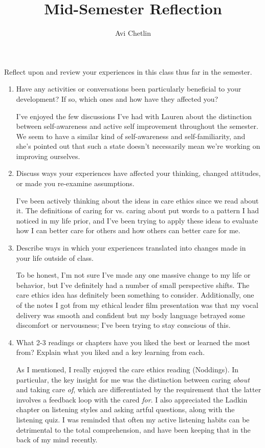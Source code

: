 \documentclass[12pt,stu,biblatex]{apa7}
\author{Avi Chetlin}
\affiliation{Case Western Reserve University}
\title{Mid-Semester Reflection}
\begin{document}
\maketitle
\singlespacing
Reflect upon and review your experiences in this class thus far in the semester.

\begin{enumerate}
  \item Have any activities or conversations been particularly beneficial to your development?
        If so, which ones and how have they affected you?

        I've enjoyed the few discussions I've had with Lauren about the distinction between self-awareness and active self improvement throughout the semester.
        We seem to have a similar kind of self-awareness and self-familiarity, and she's pointed out that such a state doesn't necessarily mean we're working on improving ourselves.

  \item Discuss ways your experiences have affected your thinking, changed attitudes, or made you re-examine assumptions.

        I've been actively thinking about the ideas in care ethics since we read about it.
        The definitions of caring for vs. caring about put words to a pattern I had noticed in my life prior, and I've been trying to apply these ideas to evaluate how I can better care for others and how others can better care for me.

  \item Describe ways in which your experiences translated into changes made in your life outside of class.

        To be honest, I'm not sure I've made any one massive change to my life or behavior, but I've definitely had a number of small perspective shifts.
        The care ethics idea has definitely been something to consider.
        Additionally, one of the notes I got from my ethical leader film presentation was that my vocal delivery was smooth and confident but my body language betrayed some discomfort or nervousness; I've been trying to stay conscious of this.

  \item What 2-3 readings or chapters have you liked the best or learned the most from?
        Explain what you liked and a key learning from each.

        As I mentioned, I really enjoyed the care ethics reading (Noddings).
        In particular, the key insight for me was the distinction between caring \textit{about} and taking care \textit{of}, which are differentiated by the requirement that the latter involves a feedback loop with the cared \textit{for}.
        I also appreciated the Ladkin chapter on listening styles and asking artful questions, along with the listening quiz.
        I was reminded that often my active listening habits can be detrimental to the total comprehension, and have been keeping that in the back of my mind recently.


\end{enumerate}
\end{document}
